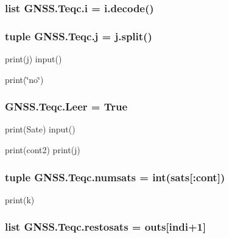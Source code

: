 \subsubsection[{i}]{\setlength{\rightskip}{0pt plus 5cm}list G\-N\-S\-S.\-Teqc.\-i = i.\-decode()}\label{namespaceGNSS_1_1Teqc_a2e071cce730e93a384bccd2eb5e3f360}
\subsubsection[{j}]{\setlength{\rightskip}{0pt plus 5cm}tuple G\-N\-S\-S.\-Teqc.\-j = j.\-split()}\label{namespaceGNSS_1_1Teqc_a1efc546925f2ca47871daee0d6ab2274}


print(j) input() 

print(\char`\"{}no\char`\"{}) 
\subsubsection[{Leer}]{\setlength{\rightskip}{0pt plus 5cm}G\-N\-S\-S.\-Teqc.\-Leer = True}\label{namespaceGNSS_1_1Teqc_ace31b4174a1680591e54cd5afa9620db}


print(\-Sate) input() 

print(cont2) print(j) 
\subsubsection[{numsats}]{\setlength{\rightskip}{0pt plus 5cm}tuple G\-N\-S\-S.\-Teqc.\-numsats = int({\bf sats}[\-:{\bf cont}])}\label{namespaceGNSS_1_1Teqc_add8e41c484901afa897ac42d19db6e99}


print(k) 

\subsubsection[{restosats}]{\setlength{\rightskip}{0pt plus 5cm}list G\-N\-S\-S.\-Teqc.\-restosats = outs[indi+1]}\label{namespaceGNSS_1_1Teqc_a704b3da9c986411974a5e8bd65339fa0}
